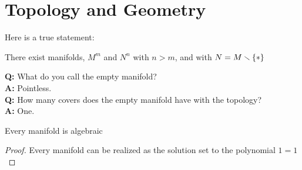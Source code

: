 \setcounter{section}{0}

\section{Topology and Geometry}
Here is a true statement:
\begin{center}
  There exist manifolds, $M^m$ and $N^n$ with $n>m$, 
  and with $N = M\smallsetminus \{\ast\}$
\end{center}

\textbf{Q:} What do you call the empty manifold?\\
\textbf{A:} Pointless.\\
\textbf{Q:} How many covers does the empty manifold 
have with the topology?\\
\textbf{A:} One.

\begin{thm}
  Every manifold is algebraic
\end{thm}
\begin{proof}
  Every manifold can be realized as the solution set 
  to the polynomial $1=1$
\end{proof}
